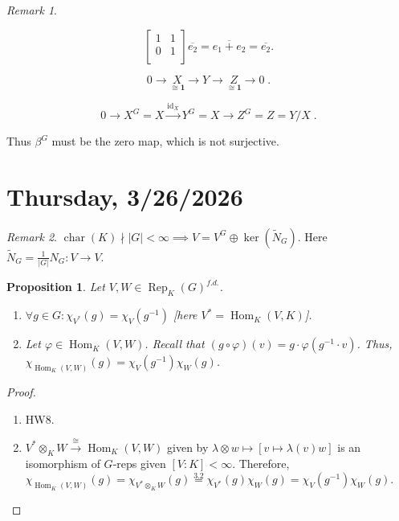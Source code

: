 \documentclass{article}
\theoremstyle{definition}
\theoremstyle{plain}
\newtheorem{proposition}[theorem]{Proposition}
\theoremstyle{remark}
\newtheorem*{remark*}{Remark}
\begin{document}
\begin{remark*}
\begin{enumerate}[label=\arabic*)]
            \[
                \begin{bmatrix}
                    1 & 1 \\
                    0 & 1 \\
                \end{bmatrix} \overline{e_2} = \overline{e_1 + e_2} = \overline{e_2}.
            \]

            \[
                0 \to \underset{\cong \mathbf{1}}{X} \to Y  \to \underset{\cong \mathbf{1}}{Z} \to 0\;. 
            \]

            \[
                0 \to X^G = X \xrightarrow{\operatorname{id}_{X}} Y^G = X \to Z^G = Z = Y / X\;.
            \]

            Thus \(\beta^G\) must be the zero map, which is not surjective.

        \end{enumerate} 
    \end{remark*}

    \section*{Thursday, 3/26/2026}
    
    \begin{remark*}
        \(\operatorname{char} (K) \nmid \vert G \vert < \infty \implies V = V^G \oplus \ker (\widetilde{N}_G)\). Here \(\widetilde{N}_G = \frac{1}{\vert G \vert} N_G : V \to V\).
    \end{remark*}

    \begin{proposition}
        Let \(V, W \in \operatorname{Rep}_K(G)^{f.d.}\).

        \begin{enumerate}[label=\roman*)]
            \item \(\forall g\in G: \chi_{V^{\ast}}(g) = \chi_V(g ^{-1})\) [here \(V^{\ast} = \operatorname{Hom}_K(V,K)\)].
            \item Let \(\varphi \in \operatorname{Hom}_K(V,W)\). Recall that \((g \circ \varphi)(v) = g \cdot \varphi(g ^{-1} \cdot v)\). Thus, \(\chi_{\operatorname{Hom}_K(V,W)}(g) = \chi_V(g ^{-1}) \chi_W(g)\). 
        \end{enumerate} 
    \end{proposition}

    \begin{proof}
        \begin{enumerate}[label=\roman*)]
            \item HW8.
            \item \(V^{\ast} \otimes_K W \xrightarrow{\cong} \operatorname{Hom}_K (V,W)\) given by \(\lambda \otimes w \mapsto [v \mapsto \lambda(v)w]\) is an isomorphism of \(G\)-reps given \([V:K] < \infty\). Therefore, \(\chi_{\operatorname{Hom}_K(V,W)}(g) = \chi_{V^{\ast} \otimes_K W}(g) \overset{3.2}{=} \chi_{V^{\ast}}(g) \chi_W(g) = \chi_V(g ^{-1}) \chi_W(g)\).
        \end{enumerate} 
    \end{proof}
\end{document}
